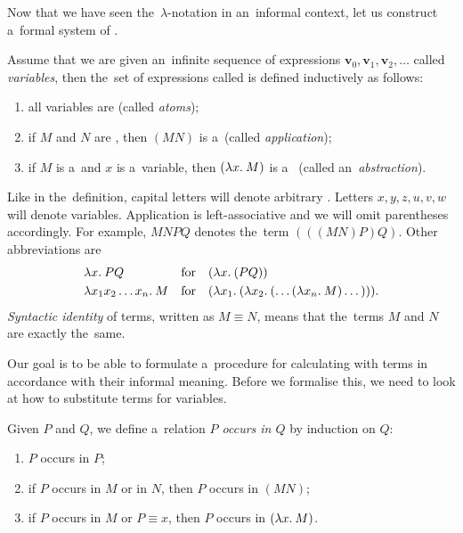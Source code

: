 Now that we have seen the~$\lambda$-notation in an~informal context, let us
construct a~formal system of \lc.
\begin{definition}\label{def:lambda_calculus}
  Assume that we are given an~infinite sequence of expressions $\mathbf{v}_0,
  \mathbf{v}_1, \mathbf{v}_2, \dots$ called \emph{variables}, then the~set of
  expressions called \lts is defined inductively as follows:
  \begin{enumerate}
    \item all variables are \lts (called \emph{atoms});
    \item if $M$ and $N$ are \lts, then $(M N)$ is a~\lt (called
      \emph{application});
    \item if $M$ is a~\lt and $x$ is a~variable, then $(\lambda x . \: M)$ is a~\lt
      (called an~\emph{abstraction}).
  \end{enumerate}
\end{definition}
Like in the~definition, capital letters will denote arbitrary \lts.
Letters $x, y, z, u, v, w$ will denote variables. Application is
left-associative and we will omit parentheses accordingly. For example,
$M N P Q$ denotes the~term $(((M N) P) Q)$. Other abbreviations are
\begin{align*}
  &{\lambda x . \: P Q}  &  &\text{for}  &  &(\lambda x . \: (P Q)) \\
  &{\lambda x_1 x_2 \dots x_n . \: M}  &  &\text{for}  &
    &(\lambda x_1 . \: (\lambda x_2 . \: (\dots(\lambda x_n . \: M) \dots))).
\end{align*}
\emph{Syntactic identity} of terms, written as $M \equiv N$, means that
the~terms $M$ and $N$ are exactly the~same.


Our goal is to be able to formulate a~procedure for calculating with terms in
accordance with their informal meaning. Before we formalise this, we need to
look at how to substitute terms for variables.

\begin{definition}
  Given \lts $P$ and $Q$, we define a~relation \emph{$P$ occurs in $Q$} by
  induction on $Q$:
  \begin{enumerate}
    \item $P$ occurs in $P$;
    \item if $P$ occurs in $M$ or in $N$, then $P$ occurs in $(M N)$;
    \item if $P$ occurs in $M$ or $P \equiv x$, then $P$ occurs in $(\lambda x . \: M)$.
  \end{enumerate}
\end{definition}

